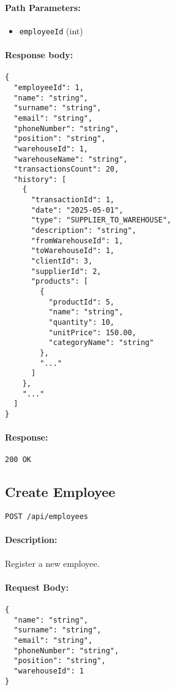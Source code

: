 \documentclass[a4paper,11pt]{article}
\begin{document}
\paragraph{Path Parameters:}
\begin{itemize}
  \item \texttt{employeeId} (int)
\end{itemize}
\paragraph{Response body:}
\begin{verbatim}
{
  "employeeId": 1,
  "name": "string",
  "surname": "string",
  "email": "string",
  "phoneNumber": "string",
  "position": "string",
  "warehouseId": 1,
  "warehouseName": "string",
  "transactionsCount": 20,
  "history": [
    {
      "transactionId": 1,
      "date": "2025-05-01",
      "type": "SUPPLIER_TO_WAREHOUSE",
      "description": "string",
      "fromWarehouseId": 1,
      "toWarehouseId": 1,
      "clientId": 3,
      "supplierId": 2,
      "products": [
        {
          "productId": 5,
          "name": "string",
          "quantity": 10,
          "unitPrice": 150.00,
          "categoryName": "string"
        },
        "..."
      ]
    },
    "..."
  ]
}
\end{verbatim}
\paragraph{Response:} \texttt{200 OK}

\subsection{Create Employee}
\label{sec:employees-create}
\begin{verbatim}
POST /api/employees
\end{verbatim}
\paragraph{Description:} Register a new employee.
\paragraph{Request Body:}
\begin{verbatim}
{
  "name": "string",
  "surname": "string",
  "email": "string",
  "phoneNumber": "string",
  "position": "string",
  "warehouseId": 1
}
\end{verbatim}
\end{document}

